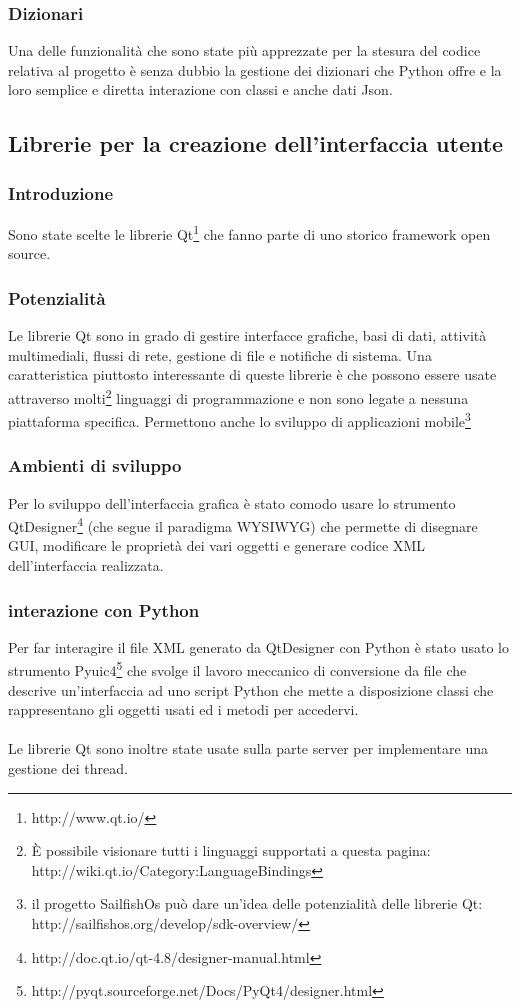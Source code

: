 \documentclass[12pt]{scrartcl}
\begin{document}
\subsubsection{Dizionari}
Una delle funzionalit\`a che sono state pi\`u apprezzate per la stesura del codice
relativa al progetto \`e senza dubbio la gestione dei dizionari che Python offre
e la loro semplice e diretta interazione con classi e anche dati Json.


\subsection{Librerie per la creazione dell'interfaccia utente}
\subsubsection{Introduzione}
Sono state scelte le librerie Qt\footnote{http://www.qt.io/} che fanno parte di uno storico
framework open source. 
\subsubsection{Potenzialit\`a}
Le librerie Qt sono in grado di gestire interfacce grafiche, basi di dati, 
attivit\`a multimediali, flussi di rete, gestione di file e notifiche di sistema.
Una caratteristica piuttosto interessante di queste librerie \`e che possono essere usate
attraverso molti\footnote{\`E possibile visionare tutti i linguaggi supportati a questa pagina: 
http://wiki.qt.io/Category:LanguageBindings}
linguaggi di programmazione e non sono legate a nessuna piattaforma specifica.
Permettono anche lo sviluppo di applicazioni mobile\footnote{
il progetto SailfishOs pu\`o dare un'idea delle potenzialit\`a delle librerie Qt:
http://sailfishos.org/develop/sdk-overview/}
\subsubsection{Ambienti di sviluppo}
Per lo sviluppo dell'interfaccia grafica \`e stato comodo usare lo strumento
QtDesigner\footnote{http://doc.qt.io/qt-4.8/designer-manual.html} (che segue il paradigma WYSIWYG) 
che permette di disegnare GUI, modificare le propriet\`a dei vari
oggetti e generare codice XML dell'interfaccia realizzata.
\subsubsection{interazione con Python}
Per far interagire il file XML generato da QtDesigner con Python
\`e stato usato lo strumento Pyuic4\footnote{http://pyqt.sourceforge.net/Docs/PyQt4/designer.html}
che svolge il lavoro meccanico di conversione da file che descrive un'interfaccia
ad uno script Python che mette a disposizione classi che rappresentano
gli oggetti usati ed i metodi  per accedervi. \\ \\
Le librerie Qt sono inoltre state usate sulla parte server per implementare una
gestione dei thread.
\end{document}
